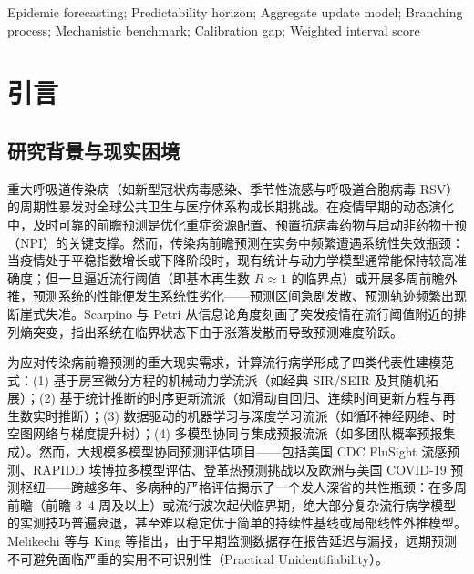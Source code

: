 \documentclass[10pt,a4paper]{article}
\theoremstyle{plain}
\theoremstyle{definition}
\begin{document}
\vspace{0.8em}
 Epidemic forecasting; Predictability horizon; Aggregate update model; Branching process; Mechanistic benchmark; Calibration gap; Weighted interval score

\vspace{1.5em}

\section{引言}\label{sec:intro}

\subsection{研究背景与现实困境}

重大呼吸道传染病（如新型冠状病毒感染、季节性流感与呼吸道合胞病毒 RSV）的周期性暴发对全球公共卫生与医疗体系构成长期挑战。在疫情早期的动态演化中，及时可靠的前瞻预测是优化重症资源配置、预置抗病毒药物与启动非药物干预（NPI）的关键支撑。然而，传染病前瞻预测在实务中频繁遭遇系统性失效瓶颈：当疫情处于平稳指数增长或下降阶段时，现有统计与动力学模型通常能保持较高准确度；但一旦逼近流行阈值（即基本再生数 $R \approx 1$ 的临界点）或开展多周前瞻外推，预测系统的性能便发生系统性劣化——预测区间急剧发散、预测轨迹频繁出现断崖式失准\citep{reich2019collaborative}。Scarpino 与 Petri\citep{scarpino2019predictability} 从信息论角度刻画了突发疫情在流行阈值附近的排列熵突变，指出系统在临界状态下由于涨落发散而导致预测难度阶跃。

为应对传染病前瞻预测的重大现实需求，计算流行病学形成了四类代表性建模范式：(1) 基于房室微分方程的机械动力学流派（如经典 SIR/SEIR 及其随机拓展）；(2) 基于统计推断的时序更新流派（如滑动自回归、连续时间更新方程与再生数实时推断）；(3) 数据驱动的机器学习与深度学习流派（如循环神经网络、时空图网络与梯度提升树）；(4) 多模型协同与集成预报流派（如多团队概率预报集成）。然而，大规模多模型协同预测评估项目——包括美国 CDC FluSight 流感预测\citep{mcgowan2019collaborative, flusight2024evaluation}、RAPIDD 埃博拉多模型评估\citep{viboud2018rapidd}、登革热预测挑战\citep{johansson2019open}以及欧洲与美国 COVID-19 预测枢纽\citep{cramer2022evaluation, sherratt2023europeanhubs}——跨越多年、多病种的严格评估揭示了一个发人深省的共性瓶颈：在多周前瞻（前瞻 3--4 周及以上）或流行波次起伏临界期，绝大部分复杂流行病学模型的实测技巧普遍衰退，甚至难以稳定优于简单的持续性基线或局部线性外推模型\citep{suez2026baseline, lopez2024challenges}。Melikechi 等\citep{melikechi2022limits}与 King 等\citep{king2015avoidable}指出，由于早期监测数据存在报告延迟与漏报，远期预测不可避免面临严重的实用不可识别性（Practical Unidentifiability）。
\end{document}
